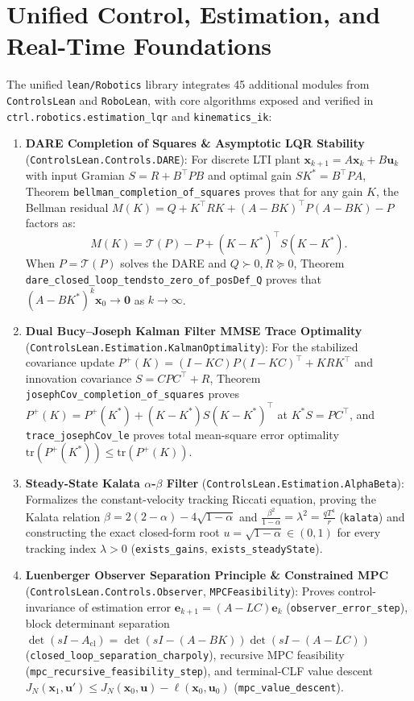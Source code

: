 \documentclass[10pt,twocolumn]{article}
\theoremstyle{definition}
\begin{document}
\section{Unified Control, Estimation, and Real-Time Foundations}

The unified \texttt{lean/Robotics} library integrates 45 additional modules from \texttt{ControlsLean} and \texttt{RoboLean}, with core algorithms exposed and verified in \texttt{ctrl.robotics.estimation\_lqr} and \texttt{kinematics\_ik}:
\begin{enumerate}[leftmargin=1.4em,itemsep=2pt]
  \item \textbf{DARE Completion of Squares \& Asymptotic LQR Stability} (\texttt{ControlsLean.Controls.DARE}): For discrete LTI plant $\mathbf{x}_{k+1} = A\mathbf{x}_k + B\mathbf{u}_k$ with input Gramian $S = R + B^\top P B$ and optimal gain $S K^* = B^\top P A$, Theorem \texttt{bellman\_completion\_of\_squares} proves that for any gain $K$, the Bellman residual $M(K) = Q + K^\top R K + (A - B K)^\top P (A - B K) - P$ factors as:
  \begin{equation}
    M(K) = \mathcal{T}(P) - P + (K - K^*)^\top S (K - K^*).
  \end{equation}
  When $P = \mathcal{T}(P)$ solves the DARE and $Q \succ 0, R \succeq 0$, Theorem \texttt{dare\_closed\_loop\_tendsto\_zero\_of\_posDef\_Q} proves that $(A - B K^*)^k \mathbf{x}_0 \to \mathbf{0}$ as $k \to \infty$.
  \item \textbf{Dual Bucy--Joseph Kalman Filter MMSE Trace Optimality} (\texttt{ControlsLean.Estimation.KalmanOptimality}): For the stabilized covariance update $P^+(K) = (I - K C)P(I - K C)^\top + K R K^\top$ and innovation covariance $S = C P C^\top + R$, Theorem \texttt{josephCov\_completion\_of\_squares} proves $P^+(K) = P^+(K^*) + (K - K^*)S(K - K^*)^\top$ at $K^* S = P C^\top$, and \texttt{trace\_josephCov\_le} proves total mean-square error optimality $\mathrm{tr}(P^+(K^*)) \le \mathrm{tr}(P^+(K))$.
  \item \textbf{Steady-State Kalata $\alpha$-$\beta$ Filter} (\texttt{ControlsLean.Estimation.AlphaBeta}): Formalizes the constant-velocity tracking Riccati equation, proving the Kalata relation $\beta = 2(2-\alpha) - 4\sqrt{1-\alpha}$ and $\frac{\beta^2}{1-\alpha} = \lambda^2 = \frac{q T^4}{r}$ (\texttt{kalata}) and constructing the exact closed-form root $u = \sqrt{1-\alpha} \in (0, 1)$ for every tracking index $\lambda > 0$ (\texttt{exists\_gains}, \texttt{exists\_steadyState}).
  \item \textbf{Luenberger Observer Separation Principle \& Constrained MPC} (\texttt{ControlsLean.Controls.Observer}, \texttt{MPCFeasibility}): Proves control-invariance of estimation error $\mathbf{e}_{k+1} = (A - L C)\mathbf{e}_k$ (\texttt{observer\_error\_step}), block determinant separation $\det(sI - A_{\text{cl}}) = \det(sI - (A - B K))\det(sI - (A - L C))$ (\texttt{closed\_loop\_separation\_charpoly}), recursive MPC feasibility (\texttt{mpc\_recursive\_feasibility\_step}), and terminal-CLF value descent $J_N(\mathbf{x}_1, \mathbf{u}') \le J_N(\mathbf{x}_0, \mathbf{u}) - \ell(\mathbf{x}_0, \mathbf{u}_0)$ (\texttt{mpc\_value\_descent}).

\end{enumerate}
\end{document}
